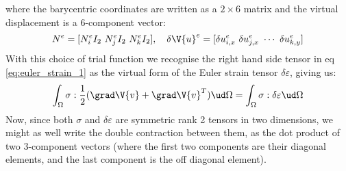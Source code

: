 \documentclass[sigconf]{acmart}
\begin{document}
where the barycentric coordinates are written as a $ 2\times 6 $ matrix and the virtual displacement is a 6-component vector:
\begin{equation*}
	N^e = [N_i^e I_2\ N_j^e I_2\ N_k^e I_2], \quad \delta \V{u}^e = [\delta u^e_{i,x} \ \delta u^e_{j,x} \ \cdots \ \delta u^e_{k,y}]
\end{equation*}
With this choice of trial function we recognise the right hand side tensor in eq \ref{eq:euler_strain_1} as the virtual form of the Euler strain tensor $ \delta \varepsilon $, giving us:
\begin{equation*}
	\int_{\Omega} \sigma : \frac{1}{2} (\grad \V{v} + \grad \V{v}^T) \ud \Omega = \int_{\Omega} \sigma : \delta \varepsilon \ud \Omega
\end{equation*}
Now, since both $ \sigma  $ and $ \delta \varepsilon $ are symmetric rank 2 tensors in two dimensions, we might as well write the double contraction between them, as the dot product of two 3-component vectors (where the first two components are their diagonal elements, and the last component is the off diagonal element).
\end{document}
